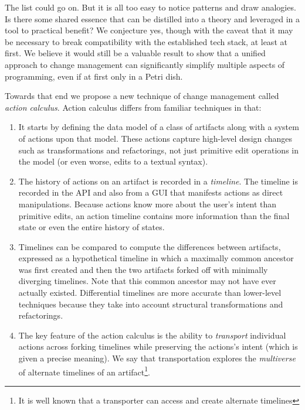 \documentclass[english,submission]{programming}
\begin{document}
\medskip
The list could go on. But it is all too easy to notice patterns and draw analogies. Is there some shared essence that can be distilled into a theory and leveraged in a tool to practical benefit? We conjecture yes, though with the caveat that it may be necessary to break compatibility with the established tech stack, at least at first. We believe it would still be a valuable result to show that a unified approach to change management can significantly simplify multiple aspects of programming, even if at first only in a Petri dish.

Towards that end we propose a new technique of change management called \textit{action calculus}. Action calculus differs from familiar techniques in that:
\begin{enumerate}

  \item It starts by defining the data model of a class of artifacts along with a system of actions upon that model. These actions capture high-level design changes such as transformations and refactorings, not just primitive edit operations in the model (or even worse, edits to a textual syntax).

  \item The history of actions on an artifact is recorded in a \textit{timeline}. The timeline is recorded in the API and also from a GUI that manifests actions as direct manipulations.
  Because actions know more about the user's intent than primitive edits, an action timeline contains more information than the final state or even the entire history of states.

  \item Timelines can be compared to compute the differences between artifacts, expressed as a hypothetical timeline in which a maximally common ancestor was first created and then the two artifacts forked off with minimally diverging timelines. Note that this common ancestor may not have ever actually existed.
  Differential timelines are more accurate than lower-level techniques because they take into account structural transformations and refactorings.

  \item The key feature of the action calculus is the ability to \textit{transport} individual actions across forking timelines while preserving the actions's intent (which is given a precise meaning).
  We say that transportation explores the \textit{multiverse} of alternate timelines of an artifact\footnote{It is well known that a transporter can access and create alternate timelines\cite{mirrormirror}}.


\end{enumerate}
\end{document}
